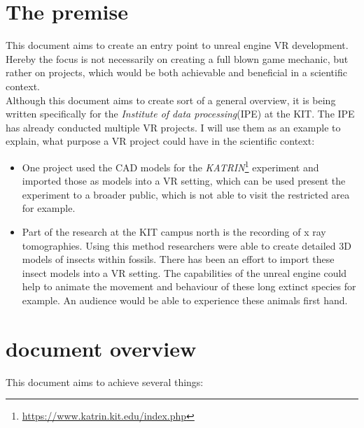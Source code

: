 \section{The premise}

This document aims to create an entry point to unreal engine VR development. Hereby the focus is not necessarily on creating a full blown game mechanic, but rather on projects, which would be both achievable and beneficial in a scientific context.\\
Although this document aims to create sort of a general overview, it is being written specifically for the \textit{Institute of data processing}(IPE) at the KIT. The IPE has already conducted multiple VR projects. I will use them as an example to explain, what purpose a VR project could have in the scientific context:

\begin{itemize}
\item One project used the CAD models for the \textit{KATRIN}\footnote{\url{https://www.katrin.kit.edu/index.php}} experiment and imported those as models into a VR setting, which can be used present the experiment to a broader public, which is not able to visit the restricted area for example.
\item Part of the research at the KIT campus north is the recording of x ray tomographies. Using this method researchers were able to create detailed 3D models of insects within fossils. There has been an effort to import these insect models into a VR setting. The capabilities of the unreal engine could help to animate the movement and behaviour of these long extinct species for example. An audience would be able to experience these animals first hand.
\end{itemize}

\section{document overview}

This document aims to achieve several things:

